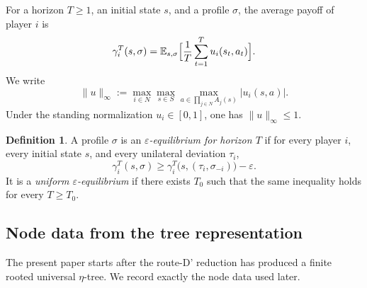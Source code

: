 \documentclass[12pt]{article}
\theoremstyle{definition}
\newtheorem{definition}[theorem]{Definition}
\newcommand{\eps}{\varepsilon}
\newcommand{\E}{\mathbb{E}}
\newcommand{\1}{\mathbf{1}}
\begin{document}
For a horizon $T\ge 1$, an initial state $s$, and a profile $\sigma$, the average
payoff of player $i$ is
\[
\gamma_i^T(s,\sigma)
=
\E_{s,\sigma}\Bigl[\frac1T\sum_{t=1}^T u_i(s_t,a_t)\Bigr].
\]
We write
\[
\|u\|_\infty
:=
\max_{i\in N}\max_{s\in S}\max_{a\in\prod_{j\in N}A_j(s)} |u_i(s,a)|.
\]
Under the standing normalization $u_i\in[0,1]$, one has $\|u\|_\infty\le 1$.

\begin{definition}
A profile $\sigma$ is an \emph{$\eps$-equilibrium for horizon $T$} if for every
player $i$, every initial state $s$, and every unilateral deviation $\tau_i$,
\[
\gamma_i^T(s,\sigma)
\ge
\gamma_i^T\bigl(s,(\tau_i,\sigma_{-i})\bigr)-\eps.
\]
It is a \emph{uniform $\eps$-equilibrium} if there exists $T_0$ such that the same
inequality holds for every $T\ge T_0$.
\end{definition}

\subsection{Node data from the tree representation}

The present paper starts after the route-D' reduction has produced a finite rooted
universal $\eta$-tree. We record exactly the node data used later.
\end{document}
